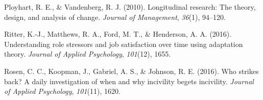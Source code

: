 \documentclass[english,,man]{apa6}
\theoremstyle{definition}
\theoremstyle{definition}
\theoremstyle{definition}
\theoremstyle{remark}
\begin{document}
\leavevmode\hypertarget{ref-ployhart_longitudinal_2010}{}%
Ployhart, R. E., \& Vandenberg, R. J. (2010). Longitudinal research: The
theory, design, and analysis of change. \emph{Journal of Management},
\emph{36}(1), 94--120.

\leavevmode\hypertarget{ref-ritter_understanding_2016}{}%
Ritter, K.-J., Matthews, R. A., Ford, M. T., \& Henderson, A. A. (2016).
Understanding role stressors and job satisfaction over time using
adaptation theory. \emph{Journal of Applied Psychology}, \emph{101}(12),
1655.

\leavevmode\hypertarget{ref-rosen_who_2016}{}%
Rosen, C. C., Koopman, J., Gabriel, A. S., \& Johnson, R. E. (2016). Who
strikes back? A daily investigation of when and why incivility begets
incivility. \emph{Journal of Applied Psychology}, \emph{101}(11), 1620.
\end{document}
